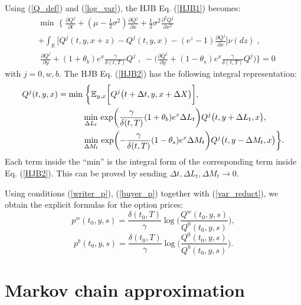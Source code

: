 Using (\ref{Q_def}) and (\ref{log_var}), the HJB Eq. (\ref{HJB1}) becomes:
\begin{align}\label{HJB2}
& \min \; \biggl\{ \; \frac{\partial Q^j}{\partial t} + (\mu-\frac{1}{2}\sigma^2) \frac{\partial Q^j}{\partial x}
+ \frac{1}{2}\sigma^2 \frac{\partial^2 Q^j}{\partial x^2} \\ \nonumber
&+ \int_\mathbb{R}
\biggl[ Q^j(t,y,x+z) - Q^j(t,y,x) - (e^z-1)\frac{\partial Q^j}{\partial x} \biggr] \nu(dz) \;,  \\ \nonumber
& \; \frac{\partial Q^j}{\partial y} +(1+\theta_b) e^x \frac{\gamma}{\delta(t,T)}Q^j \; , 
\; -\biggl( \frac{\partial Q^j}{\partial y}+(1-\theta_s)e^x \frac{\gamma}{\delta(t,T)} Q^j 
\biggr) \biggr\} = 0 
 \end{align}
with $j=0,w,b$.
The HJB Eq. (\ref{HJB2}) has the following integral representation: 
\begin{align}\label{HJB25}
 Q^j(t,y,x) = \min & \; \biggl\{ \mathbb{E}_{y,x} \biggl[ Q^j \bigl( t+\Delta t, y, x + \Delta X \bigr) \biggr], \\ \nonumber
 & \min_{\Delta L_t} \, \exp \biggl(\frac{\gamma}{\delta(t,T)} (1+\theta_b) e^x \Delta L_t \biggr) 
 Q^j \bigl(t,y+\Delta L_t, x \bigr), \\ \nonumber
 & \min_{\Delta M_t} \, \exp \biggl(- \frac{\gamma}{\delta(t,T)} (1-\theta_s) e^x \Delta M_t \biggr) Q^j \bigl(t,y-\Delta M_t, x \bigr)
 \biggr\}.
\end{align}
Each term inside the ``min'' is the integral form of the corresponding term inside Eq. (\ref{HJB2}). This can be proved by sending $\Delta t, \Delta L_t, \Delta M_t
 \to 0$. 

Using conditions (\ref{writer_p}), (\ref{buyer_p}) together with (\ref{var_reduct}), we obtain the explicit formulas for the option prices:
\begin{equation}\label{opt_w}
 p^w(t_0,y,s) = \frac{\delta(t_0,T)}{\gamma} \log \biggl( \frac{Q^w(t_0,y,s)}{Q^0(t_0,y,s)} \biggr),
\end{equation}
\begin{equation}\label{opt_b}
 p^b(t_0,y,s) = \frac{\delta(t_0,T)}{\gamma} \log \biggl( \frac{Q^0(t_0,y,s)}{Q^b(t_0,y,s)} \biggr).
\end{equation}




\section{Markov chain approximation} \label{MC_section}

